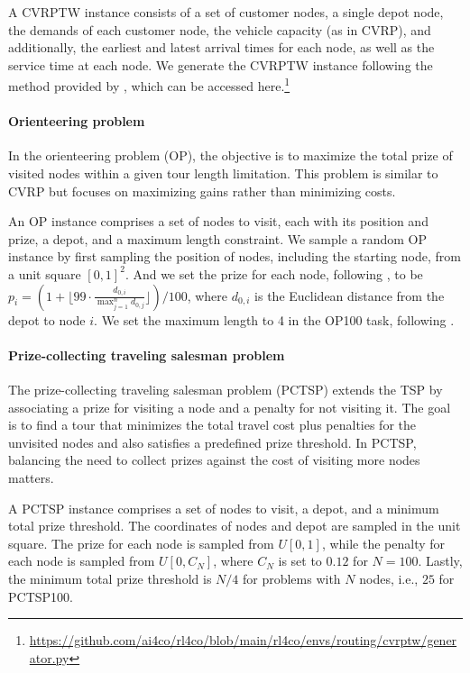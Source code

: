 \documentclass[twoside]{article}
\theoremstyle{plain}
\theoremstyle{definition}
\theoremstyle{remark}
\begin{document}
A CVRPTW instance consists of a set of customer nodes, a single depot node, the demands of each customer node, the vehicle capacity (as in CVRP), and additionally, the earliest and latest arrival times for each node, as well as the service time at each node. We generate the CVRPTW instance following the method provided by \citet{berto2023rl4co}, which can be accessed here.\footnote{\url{https://github.com/ai4co/rl4co/blob/main/rl4co/envs/routing/cvrptw/generator.py}}

\paragraph{Orienteering problem}
In the orienteering problem (OP), the objective is to maximize the total prize of visited nodes within a given tour length limitation. This problem is similar to CVRP but focuses on maximizing gains rather than minimizing costs.

An OP instance comprises a set of nodes to visit, each with its position and prize, a depot, and a maximum length constraint. We sample a random OP instance by first sampling the position of nodes, including the starting node, from a unit square $[0, 1]^2$. And we set the prize for each node, following \cite{fischetti1998solving,ye2023deepaco}, to be $p_i = (1 + \lfloor 99 \cdot \frac{d_{0,i}}{\max_{j=1}^{n}{d_{0,j}}} \rfloor) / 100$, where $d_{0,i}$ is the Euclidean distance from the depot to node $i$. We set the maximum length to 4 in the OP100 task, following \citet{kool2018attention}.

\paragraph{Prize-collecting traveling salesman problem}
The prize-collecting traveling salesman problem (PCTSP) extends the TSP by associating a prize for visiting a node and a penalty for not visiting it. The goal is to find a tour that minimizes the total travel cost plus penalties for the unvisited nodes and also satisfies a predefined prize threshold. In PCTSP, balancing the need to collect prizes against the cost of visiting more nodes matters.

A PCTSP instance comprises a set of nodes to visit, a depot, and a minimum total prize threshold. The coordinates of nodes and depot are sampled in the unit square. The prize for each node is sampled from $U[0,1]$, while the penalty for each node is sampled from $U[0, C_N]$, where $C_N$ is set to $0.12$ for $N=100$. Lastly, the minimum total prize threshold is $N/4$ for problems with ${N}$ nodes, i.e., $25$ for PCTSP100.
\end{document}
